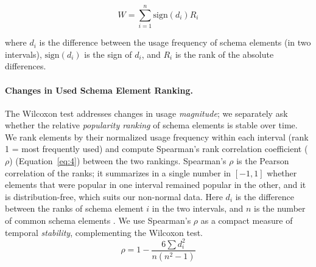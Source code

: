 \documentclass[sw]{iosart2x}
\begin{document}
\begin{equation}
W = \sum_{i=1}^n \text{sign}(d_i) R_i
\label{eq:wilcoxon}
\end{equation}

where \(d_i\) is the difference between the usage frequency of schema elements (in two intervals), \( \text{sign}(d_i) \) is the sign of \(d_i\), and \(R_i\) is the rank of the absolute differences.


\paragraph{\textbf{Changes in Used Schema Element Ranking.}}
The Wilcoxon test addresses changes in usage \emph{magnitude}; we separately ask whether the relative \emph{popularity ranking} of schema elements is stable over time. We rank elements by their normalized usage frequency within each interval (rank 1 = most frequently used) and compute Spearman's rank correlation coefficient (\( \rho \)) (Equation~\ref{eq:4}) between the two rankings. Spearman's \( \rho \) is the Pearson correlation of the ranks; it summarizes in a single number in \([-1,1]\) whether elements that were popular in one interval remained popular in the other, and it is distribution-free, which suits our non-normal data. Here \( d_i \) is the difference between the ranks of schema element \( i \) in the two intervals, and \( n \) is the number of common schema elements \cite{spearman1961proof}. We use Spearman's \( \rho \) as a compact measure of temporal \emph{stability}, complementing the Wilcoxon test.
\begin{equation}
\rho = 1 - \frac{6 \sum d_i^2}{n(n^2 - 1)}
\label{eq:4}
\end{equation}


\end{document}
